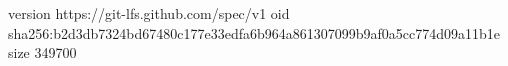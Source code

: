 version https://git-lfs.github.com/spec/v1
oid sha256:b2d3db7324bd67480c177e33edfa6b964a861307099b9af0a5cc774d09a11b1e
size 349700
